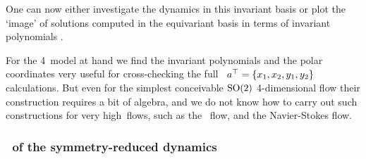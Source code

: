 One can now either investigate the dynamics in this invariant basis or
plot the `image' of solutions computed in the equivariant
basis  in terms of invariant polynomials
.

For the 4\dmn\ model at hand we find the invariant polynomials 
and the polar coordinates  very useful for cross-checking the
full \statesp\ ${a}{}^\top = \{ x_1, x_2,y_1, y_2\}$ calculations.
But even
for the simplest conceivable $\textrm{SO}(2)$ 4-dimensional flow their
construction requires a bit of algebra, and we do not know
how to carry out such constructions for very high\dmn\ flows,
such as the \KS\ flow, and the Navier-Stokes flow.


\subsubsection{\Eqva\ of the symmetry-reduced dynamics}
\label{s:eqva}


